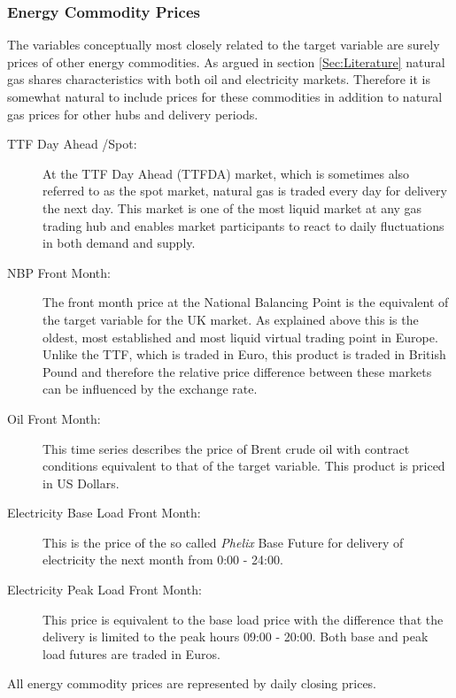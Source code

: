 \subsubsection{Energy Commodity Prices}
The variables conceptually most closely related to the target variable are surely prices of other energy commodities. As argued in  section \ref{Sec:Literature} natural gas shares characteristics with both oil and electricity markets. Therefore it is somewhat natural to include prices for these commodities in addition to natural gas prices for other hubs and delivery periods.
\begin{description}
\item[TTF Day Ahead /Spot:] At the TTF Day Ahead (TTFDA) market, which is sometimes also referred to as the spot market, natural gas is traded every day for delivery the next day. This market is one of the most liquid market at any gas trading hub and enables market participants to react to daily fluctuations in both demand and supply.
\item[NBP Front Month:] The front month price at the National Balancing Point is the equivalent of the target variable for the UK market. As explained above this is the oldest, most established and most liquid virtual trading point in Europe. Unlike the TTF, which is traded in Euro, this product is traded in British Pound and therefore the relative price difference between these markets can be influenced by the exchange rate.
\item[Oil Front Month:] This time series describes the price of  Brent crude oil with contract conditions equivalent to that of the target variable. This product is priced in US Dollars.
\item[Electricity Base Load Front Month:] This is the price of the so called \textit{Phelix} Base Future for delivery of electricity the next month from 0:00 - 24:00.
\item[Electricity Peak Load Front Month:] This price is equivalent to the base load price with the difference that the delivery is limited to the peak hours 09:00 - 20:00. Both base and peak load futures are traded in Euros.
\end{description}
All energy commodity prices are represented by daily closing prices.
